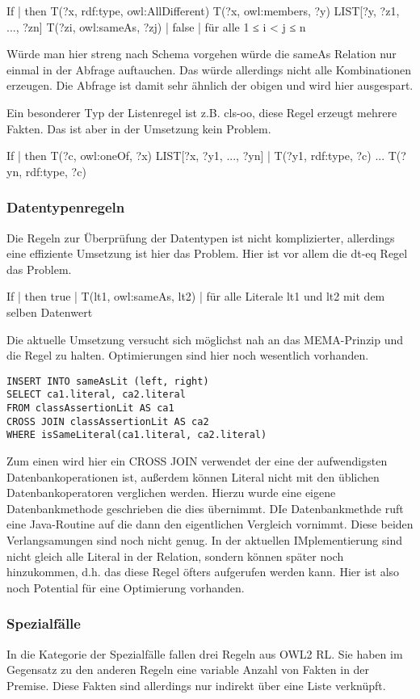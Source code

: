If | then
T(?x, rdf:type, owl:AllDifferent)
T(?x, owl:members, ?y)
LIST[?y, ?z1, ..., ?zn]
T(?zi, owl:sameAs, ?zj) 	          | false 	| für alle 1 ≤ i < j ≤ n

Würde man hier streng nach Schema vorgehen würde die sameAs Relation nur einmal in der Abfrage auftauchen. Das würde allerdings nicht alle Kombinationen erzeugen. Die Abfrage ist damit sehr ähnlich der obigen und wird hier ausgespart.

Ein besonderer Typ der Listenregel ist z.B. cls-oo, diese Regel erzeugt mehrere Fakten. Das ist aber in der Umsetzung kein Problem.

If | then
T(?c, owl:oneOf, ?x)
LIST[?x, ?y1, ..., ?yn] 	 | T(?y1, rdf:type, ?c)
								...
								T(?yn, rdf:type, ?c) 

\subsubsection{Datentypenregeln}
Die Regeln zur Überprüfung der Datentypen ist nicht komplizierter, allerdings eine effiziente Umsetzung ist hier das Problem. Hier ist vor allem die dt-eq Regel das Problem.

If | then
true | T(lt1, owl:sameAs, lt2) | für alle Literale lt1 und lt2 mit dem selben Datenwert

Die aktuelle Umsetzung versucht sich möglichst nah an das MEMA-Prinzip und die Regel zu halten. Optimierungen sind hier noch wesentlich vorhanden.

\begin{lstlisting}
INSERT INTO sameAsLit (left, right)
SELECT ca1.literal, ca2.literal
FROM classAssertionLit AS ca1
CROSS JOIN classAssertionLit AS ca2
WHERE isSameLiteral(ca1.literal, ca2.literal)
\end{lstlisting}

Zum einen wird hier ein CROSS JOIN verwendet der eine der aufwendigsten Datenbankoperationen ist, außerdem können Literal nicht mit den üblichen Datenbankoperatoren verglichen werden. Hierzu wurde eine eigene Datenbankmethode geschrieben die dies übernimmt. DIe Datenbankmethde ruft eine Java-Routine auf die dann den eigentlichen Vergleich vornimmt. Diese beiden Verlangsamungen sind noch nicht genug. In der aktuellen IMplementierung sind nicht gleich alle Literal in der Relation, sondern können später noch hinzukommen, d.h. das diese Regel öfters aufgerufen werden kann. Hier ist also noch Potential für eine Optimierung vorhanden.


\subsubsection{Spezialfälle} 
In die Kategorie der Spezialfälle fallen drei Regeln aus OWL2 RL. Sie haben im Gegensatz zu den anderen Regeln eine variable Anzahl von Fakten in der Premise. Diese Fakten sind allerdings nur indirekt über eine Liste verknüpft.
 
